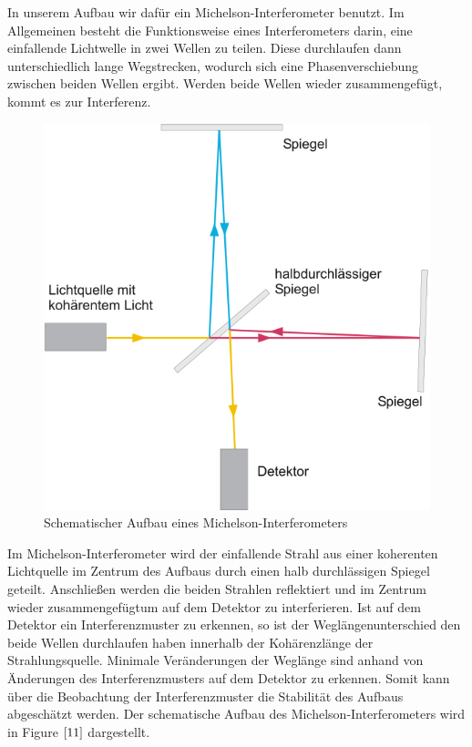 \documentclass[12pt,a4paper]{article}
\begin{document}
In unserem Aufbau wir dafür ein Michelson-Interferometer benutzt. Im Allgemeinen besteht die Funktionsweise eines Interferometers darin, eine einfallende Lichtwelle in zwei Wellen zu teilen. Diese durchlaufen dann unterschiedlich lange Wegstrecken, wodurch sich eine Phasenverschiebung zwischen beiden Wellen ergibt. Werden beide Wellen wieder zusammengefügt, kommt es zur Interferenz. \begin{figure}[h]
	\includegraphics[scale = 0.5]{Michelson.png}
	\centering
	\caption{Schematischer Aufbau eines Michelson-Interferometers}
	\label{11}
\end{figure}Im Michelson-Interferometer wird der einfallende Strahl aus einer koherenten Lichtquelle im Zentrum des Aufbaus durch einen halb durchlässigen Spiegel geteilt. Anschließen werden die beiden Strahlen reflektiert und im Zentrum wieder zusammengefügtum auf dem Detektor zu interferieren. Ist auf dem Detektor ein Interferenzmuster zu erkennen, so ist der Weglängenunterschied den beide Wellen durchlaufen haben innerhalb der Kohärenzlänge der Strahlungsquelle. Minimale Veränderungen der Weglänge sind anhand von Änderungen des Interferenzmusters auf dem Detektor zu erkennen. Somit kann über die Beobachtung der Interferenzmuster die Stabilität des Aufbaus abgeschätzt werden. Der schematische Aufbau des Michelson-Interferometers wird in Figure $\ref{11}$ dargestellt.
\end{document}
